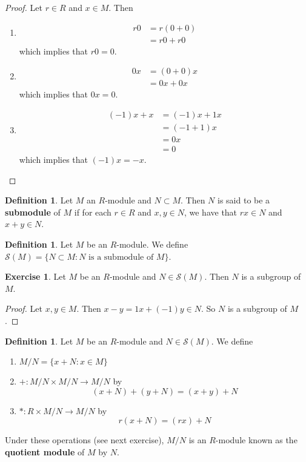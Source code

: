 \documentclass[12pt]{amsart}
\theoremstyle{definition}
\newtheorem{defn}[definition]{Definition}
\newtheorem{ex}[definition]{Exercise}
\newcommand{\MS}{\mathcal{S}}
\begin{document}
	\begin{proof} Let $r \in R$ and $x \in M$. Then 
	\begin{enumerate}
	\item 
	\begin{align*}
	r0 
	&= r(0+0) \\
	&= r0 + r0
	\end{align*} 
	which implies that $r0 = 0$.
	\item 
	\begin{align*}
	0x 
	&= (0+0)x \\
	&= 0x + 0x
	\end{align*} 
	which implies that $0x = 0$.
	\item 
	\begin{align*}
	(-1)x + x 
	&= (-1)x + 1x \\ 
	&= (-1 + 1)x \\
	&= 0x \\
	&= 0
	\end{align*}
	which implies that $(-1)x = -x$.
	\end{enumerate}
	\end{proof}
	
	\begin{defn}
	Let $M$ an $R$-module and $N \subset M$. Then $N$ is said to be a \textbf{submodule} of $M$ if for each $r \in R$ and $x,y \in N$, we have that $rx \in N$ and $x+y \in N$.
	\end{defn}
	
	\begin{defn}
	Let $M$ be an $R$-module. We define $\MS(M) = \{N \subset M: N \text{ is a submodule of }M\}$.
	\end{defn}	
	
	\begin{ex}
	Let $M$ be an $R$-module and $N \in \MS(M)$. Then $N$ is a subgroup of $M$.
	\end{ex}
	
	\begin{proof}
	Let $x,y \in M$. Then $x-y = 1x + (-1)y \in N$. So $N$ is a subgroup of $M$.
	\end{proof}
	
	\begin{defn}
	Let $M$ be an $R$-module and $N \in \MS(M)$. We define  
	\begin{enumerate}
	\item $M/N = \{x + N: x \in M\}$ 
	\item $+: M/N \times M/N \rightarrow M/N$ by $$(x+N) + (y+N) = (x+y) + N$$
	\item $*: R \times M/N \rightarrow M/N$ by $$r(x+N) = (rx) + N$$
	\end{enumerate}
	Under these operations (see next exercise), $M/N$ is an $R$-module known as the \textbf{quotient module} of $M$ by $N$.
	\end{defn}	
	
\end{document}
